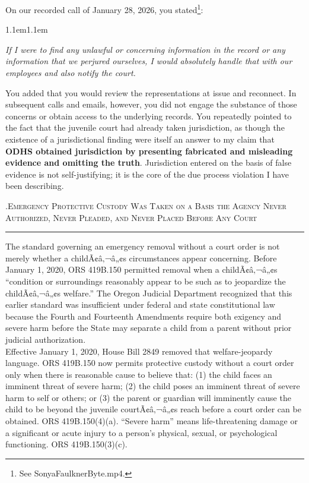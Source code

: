 \documentclass[10pt,a4paper,roman]{moderncv}
\newcounter{legalsection}
\renewcommand{\thelegalsection}{\arabic{legalsection}}
\newcommand{\legalsection}[1]{%
	\refstepcounter{legalsection}%
	\par\addvspace{1.15em}%
	{\color{inkblue}\normalfont\large\scshape
		\thelegalsection.\hspace{0.55em}#1\par}%
	\vspace{0.25em}%
	{\color{inkblue}\rule{\linewidth}{0.8pt}}%
	\par\vspace{0.65em}%
}
\renewenvironment{quote}{%
	\par\smallskip{\color{inkblue}\rule{\linewidth}{0.7pt}}\par\vspace{6pt}%
	\leftskip1.1em\rightskip1.1em\itshape\color{inkblue!92!black}%
}{%
	\par\vspace{6pt}{\color{inkblue}\rule{\linewidth}{0.7pt}}\par\smallskip%
}
\begin{document}
	On our recorded call of January 28, 2026, you stated\footnote{See SonyaFaulknerByte.mp4.}:
	
	\begin{center}
		\begin{minipage}{0.80\textwidth}
			\begin{quote}
				\textit{If I were to find any unlawful or concerning information in the record or any information that we perjured ourselves, I would absolutely handle that with our employees and also notify the court.}
			\end{quote}
		\end{minipage}
	\end{center}
	
	\vspace{1em}
	You added that you would review the representations at issue and reconnect. In subsequent calls and emails, however, you did not engage the substance of those concerns or obtain access to the underlying records. You repeatedly pointed to the fact that the juvenile court had already taken jurisdiction, as though the existence of a jurisdictional finding were itself an answer to my claim that \textbf{ODHS obtained jurisdiction by presenting fabricated and misleading evidence and omitting the truth}. Jurisdiction entered on the basis of false evidence is not self-justifying; it is the core of the due process violation I have been describing.
	
	\legalsection{Emergency Protective Custody Was Taken on a Basis the Agency Never Authorized, Never Pleaded, and Never Placed Before Any Court}
	
	\noindent The standard governing an emergency removal without a court order is not merely whether a childÃ¢â‚¬â„¢s circumstances appear concerning. Before January 1, 2020, ORS 419B.150 permitted removal when a childÃ¢â‚¬â„¢s ``condition or surroundings reasonably appear to be such as to jeopardize the childÃ¢â‚¬â„¢s welfare.'' The Oregon Judicial Department recognized that this earlier standard was insufficient under federal and state constitutional law because the Fourth and Fourteenth Amendments require both exigency and severe harm before the State may separate a child from a parent without prior judicial authorization.\\
	
	\noindent Effective January 1, 2020, House Bill 2849 removed that welfare-jeopardy language. ORS 419B.150 now permits protective custody without a court order only when there is reasonable cause to believe that: (1) the child faces an imminent threat of severe harm; (2) the child poses an imminent threat of severe harm to self or others; or (3) the parent or guardian will imminently cause the child to be beyond the juvenile courtÃ¢â‚¬â„¢s reach before a court order can be obtained. ORS 419B.150(4)(a). ``Severe harm'' means life-threatening damage or a significant or acute injury to a person's physical, sexual, or psychological functioning. ORS 419B.150(3)(c).\\
	
\end{document}
